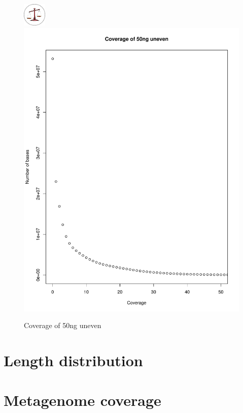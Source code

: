 \documentclass[a4paper,12pt]{report}
\begin{document}
\begin{figure}[ht!]
  \centering
    \includegraphics[width=0.1\textwidth]{figures/logos/uneven.png}
  \centering
    \includegraphics[width=\textwidth,trim=0 0 0 50, clip]{figures/coverageperbase-50ng_unbalanced.pdf}
  \caption{Coverage of 50ng uneven}
  \label{fig:coverage50nguneven}
\end{figure}


\section{Length distribution}

\section{Metagenome coverage}
\end{document}
